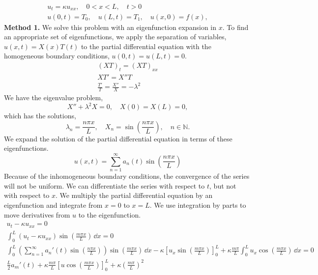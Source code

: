 {%
\begin{Solution}
  \label{solution diffusion nonzero bc}
  \begin{gather*}
    u_t = \kappa u_{x x}, \quad 0 < x < L, \quad t > 0 \\
    u(0,t) = T_0, \quad u(L,t) = T_1, \quad u(x,0) = f(x),
  \end{gather*}
  \textbf{Method 1.}
  We solve this problem with an eigenfunction expansion in $x$.  To find
  an appropriate set of eigenfunctions, we apply the separation of variables,
  $u(x,t) = X(x) T(t)$ to the partial differential equation with the 
  homogeneous boundary conditions, $u(0,t) = u(L,t) = 0$.  
  \begin{gather*}
    (X T)_t = (X T)_{x x} \\
    X T' = X'' T \\
    \frac{T'}{T} = \frac{X''}{X} = - \lambda^2
  \end{gather*}
  We have the eigenvalue problem,
  \[
  X'' + \lambda^2 X = 0, \quad X(0) = X(L) = 0,
  \]
  which has the solutions,
  \[
  \lambda_n = \frac{n \pi x}{L}, \quad 
  X_n = \sin \left( \frac{n \pi x}{L} \right), \quad n \in \mathbb{N}.
  \]
  We expand the solution of the partial differential equation in terms of 
  these eigenfunctions.
  \[
  \boxed{
    u(x,t) = \sum_{n=1}^\infty a_n(t) \sin \left( \frac{n \pi x}{L} \right)
    }
  \]
  Because of the inhomogeneous boundary conditions, the convergence of the
  series will not be uniform.  We can differentiate the series with respect to 
  $t$, but not with respect to $x$.  We multiply the partial differential
  equation by an eigenfunction and integrate from $x=0$ to $x=L$.  We
  use integration by parts to move derivatives from $u$ to the eigenfunction.
  \begin{gather*}
    u_t - \kappa u_{x x} = 0 \\
    \int_0^L \left( u_t - \kappa u_{x x} \right) \sin \left(
      \frac{m \pi x}{L} \right) \,\dd x = 0 \\
    \int_0^L \left( \sum_{n=1}^\infty a_n'(t) \sin \left( \frac{n \pi x}{L} \right) \right)
    \sin \left( \frac{m \pi x}{L} \right) \,\dd x 
    - \kappa \left[ u_x \sin \left( \frac{m \pi x}{L} \right) \right]_0^L
    + \kappa \frac{m \pi}{L} 
    \int_0^L u_x \cos \left( \frac{m \pi x}{L} \right) \,\dd x = 0 \\
    \frac{L}{2} a_m'(t) 
    + \kappa \frac{m \pi}{L} 
    \left[ u \cos \left( \frac{m \pi x}{L} \right) \right]_0^L
    + \kappa \left( \frac{m \pi}{L} \right)^2

\end{gather*}
\end{Solution}}

